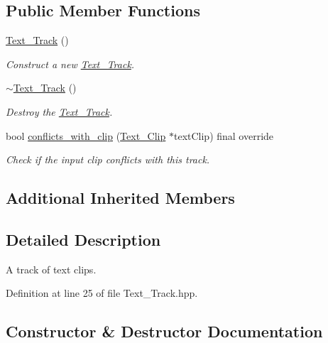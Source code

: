 \subsection*{Public Member Functions}
\begin{DoxyCompactItemize}
\item 
\mbox{\hyperlink{classprz_1_1_text___track_ac87a34649f6084c8a048b0fa3ebcef33}{Text\+\_\+\+Track}} ()
\begin{DoxyCompactList}\small\item\em Construct a new \mbox{\hyperlink{classprz_1_1_text___track}{Text\+\_\+\+Track}}. \end{DoxyCompactList}\item 
\mbox{\hyperlink{classprz_1_1_text___track_afc271eaf47473488c65986d56c9bdc51}{$\sim$\+Text\+\_\+\+Track}} ()
\begin{DoxyCompactList}\small\item\em Destroy the \mbox{\hyperlink{classprz_1_1_text___track}{Text\+\_\+\+Track}}. \end{DoxyCompactList}\item 
bool \mbox{\hyperlink{classprz_1_1_text___track_af19070ff05eb7922539baa043441145c}{conflicts\+\_\+with\+\_\+clip}} (\mbox{\hyperlink{classprz_1_1_text___clip}{Text\+\_\+\+Clip}} $\ast$text\+Clip) final override
\begin{DoxyCompactList}\small\item\em Check if the input clip conflicts with this track. \end{DoxyCompactList}\end{DoxyCompactItemize}
\subsection*{Additional Inherited Members}


\subsection{Detailed Description}
A track of text clips. 



Definition at line 25 of file Text\+\_\+\+Track.\+hpp.



\subsection{Constructor \& Destructor Documentation}
\mbox{\label{classprz_1_1_text___track_ac87a34649f6084c8a048b0fa3ebcef33}} 
